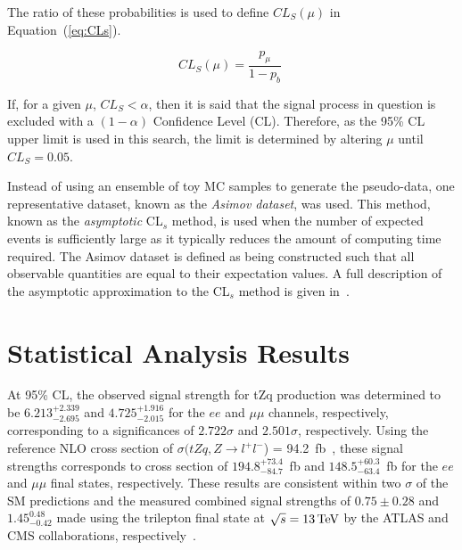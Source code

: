 The ratio of these probabilities is used to define $CL_{S} (\mu)$ in Equation~(\ref{eq:CLs}).

\begin{equation}
CL_{S} (\mu) = \frac{ p_{\mu} }{ 1 - p_{b} }\;
\label{eq:CLs}
\end{equation}

If, for a given $\mu$, $CL_{S} < \alpha$, then it is said that the signal process in question is excluded with a $(1 - \alpha)$ Confidence Level (CL).
Therefore, as the 95\% CL upper limit is used in this search, the limit is determined by altering $\mu$  until $CL_{S} = 0.05$.

Instead of using an ensemble of toy MC samples to generate the pseudo-data, one representative dataset, known as the \emph{Asimov dataset}, was used.
This method, known as the \emph{asymptotic} CL$_{s}$ method, is used when the number of expected events is sufficiently large as it typically reduces the amount of computing time required.
The Asimov dataset is defined as being constructed such that all observable quantities are equal to their expectation values.
A full description of the asymptotic approximation to the CL$_{s}$ method is given in~\cite{AsymptoticFormulae}.

\clearpage
\newpage

\section{Statistical Analysis Results}\label{sec:results}
At 95\% CL, the observed signal strength for tZq production was determined to be $6.213_{-2.695}^{+2.339}$ and $4.725_{-2.015}^{+1.916}$ for the $ee$ and $\mu\mu$ channels, respectively, corresponding to a significances of $2.722 \sigma$ and $2.501\sigma$, respectively. %
Using the reference NLO cross section of $\sigma (tZq, Z \rightarrow l^{+} l^{-}$) = 94.2~fb~\cite{Campbell:2013yla}, these signal strengths corresponds to cross section of $194.8_{-84.7}^{+73.4}$~fb and $148.5_{-63.4}^{+60.3}$~fb for the $ee$ and $\mu\mu$ final states, respectively. %
These results are consistent within two $\sigma$ of the SM predictions and the measured combined signal strengths of $0.75 \pm 0.28$ and $1.45^{0.48}_{-0.42}$ made using the trilepton final state at $\sqrt{s} = 13 \,\text{Te\hspace{-.08em}V}$ by the ATLAS and CMS collaborations, respectively~\cite{Aaboud:2017ylb,Sirunyan:2017nbr}.

